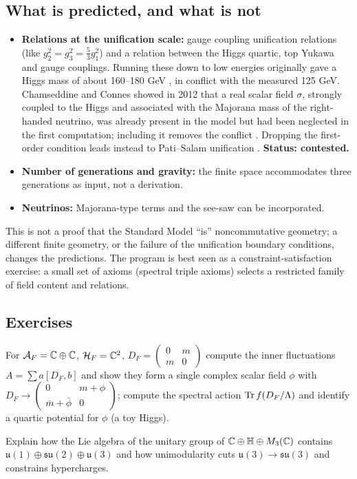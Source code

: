\subsection{What is predicted, and what is not}

\begin{itemize}
\item \textbf{Relations at the unification scale:} gauge coupling unification relations (like $g_2^2=g_3^2=\tfrac53g_1^2$) and a relation between the Higgs quartic, top Yukawa and gauge couplings. Running these down to low energies originally gave a Higgs mass of about 160--180 GeV \cite{CCM2007}, in conflict with the measured 125 GeV. Chamseddine and Connes showed in 2012 that a real scalar field $\sigma$, strongly coupled to the Higgs and associated with the Majorana mass of the right-handed neutrino, was already present in the model but had been neglected in the first computation; including it removes the conflict \cite{ChamseddineConnes2012}. Dropping the first-order condition leads instead to Pati--Salam unification \cite{CCvS2013}. \textbf{Status: contested.}
\item \textbf{Number of generations and gravity:} the finite space accommodates three generations as input, not a derivation.
\item \textbf{Neutrinos:} Majorana-type terms and the see-saw can be incorporated.
\end{itemize}

\begin{whatwrong}
This is not a proof that the Standard Model ``is'' noncommutative geometry; a different finite geometry, or the failure of the unification boundary conditions, changes the predictions. The program is best seen as a constraint-satisfaction exercise: a small set of axioms (spectral triple axioms) selects a restricted family of field content and relations.
\end{whatwrong}

\subsection*{Exercises}
\begin{exercise}\label{ex:almost_comm:1}
For $\mathcal{A}_F=\mathbb{C}\oplus\mathbb{C}$, $\mathcal{H}_F=\mathbb{C}^2$, $D_F=\begin{pmatrix}0&m\\m&0\end{pmatrix}$ compute the inner fluctuations $A=\sum a[D_F,b]$ and show they form a single complex scalar field $\phi$ with $D_F\to\begin{pmatrix}0&m+\phi\\\bar m+\bar\phi&0\end{pmatrix}$; compute the spectral action $\operatorname{Tr} f(D_F/\Lambda)$ and identify a quartic potential for $\phi$ (a toy Higgs).
\end{exercise}
\begin{exercise}\label{ex:almost_comm:2}
Explain how the Lie algebra of the unitary group of $\mathbb{C}\oplus\mathbb H\oplus M_3(\mathbb{C})$ contains $\mathfrak u(1)\oplus\mathfrak{su}(2)\oplus\mathfrak u(3)$ and how unimodularity cuts $\mathfrak u(3)\to\mathfrak{su}(3)$ and constrains hypercharges.
\end{exercise}

